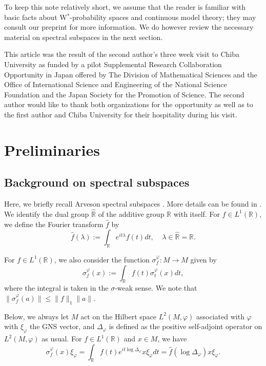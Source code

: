 \documentclass[12pt]{amsart}
\theoremstyle{definition}
\begin{document}
To keep this note relatively short, we assume that the reader is familiar with basic facts about W$^*$-probability spaces and continuous model theory; they may consult our preprint \cite{AG2026_bicentralizer} for more information.  We do however review the necessary material on spectral subspaces in the next section.

This article was the result of the second author's three week visit to Chiba University as funded by a pilot Supplemental Research Collaboration Opportunity in Japan offered by The Division of Mathematical Sciences and the Office of International Science and Engineering of the National Science Foundation and the Japan Society for the Promotion of Science.  The second author would like to thank both organizations for the opportunity as well as to the first author and Chiba University for their hospitality during his visit.  

\section{Preliminaries}

\subsection{Background on spectral subspaces}

Here, we briefly recall Arveson spectral subspaces \cite{Arveson74}. More details can be found in  \cite[Chapter XI]{takesakiII}. 
We identify the dual group $\widehat{\mathbb{R}}$ of the additive group $\mathbb{R}$ with itself. For $f\in L^1(\mathbb{R})$, we define the Fourier transform $\hat{f}$  by 
\[\hat{f}(\lambda):=\int_{\mathbb{R}}e^{it\lambda}f(t)dt,\ \ \ \ \ \lambda \in \widehat{\mathbb{R}}=\mathbb{R}.\]

For $f\in L^1(\mathbb{R})$, we also consider the function $\sigma_f^\varphi:M\to M$ given by $$\sigma_f^{\varphi}(x):=\int_{\mathbb{R}}f(t)\sigma_t^{\varphi}(x)dt,$$ where the integral is taken in the $\sigma$-weak sense.  We note that $\|\sigma^\varphi_f(a)\|\leq \|f\|_1\|a\|$.

Below, we always let $M$ act on the Hilbert space $L^2(M,\varphi)$ associated with $\varphi$ with $\xi_{\varphi}$ the GNS vector, and $\Delta_{\varphi}$ is defined as the positive self-adjoint operator on $L^2(M,\varphi)$ as usual. 
For $f\in L^1(\mathbb R)$ and $x\in M$, we have 
\begin{equation}\sigma_f^{\varphi}(x)\xi_{\varphi}=\int_{\mathbb{R}}f(t)e^{it\log \Delta_{\varphi}}x\xi_{\varphi}dt=\hat{f}(\log \Delta_{\varphi})x\xi_{\varphi}.\label{eq modular op}
\end{equation}
\end{document}
